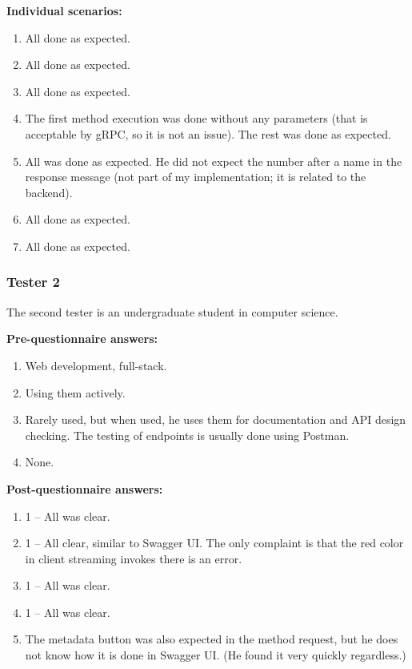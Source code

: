 \textbf{Individual scenarios:}
\begin{enumerate}
    \item All done as expected.
    \item All done as expected.
    \item All done as expected.
    \item The first method execution was done without any parameters (that is acceptable by gRPC, so it is not an issue).
    The rest was done as expected.
    \item All was done as expected.
    He did not expect the number after a name in the response message (not part of my implementation; it is related to the backend).
    \item All done as expected.
    \item All done as expected.
\end{enumerate}

\subsubsection{Tester 2}
The second tester is an undergraduate student in computer science.

\textbf{Pre-questionnaire answers:}
\begin{enumerate}
    \item Web development, full-stack.
    \item Using them actively.
    \item Rarely used, but when used, he uses them for documentation and API design checking.
    The testing of endpoints is usually done using Postman.
    \item None.
\end{enumerate}

\textbf{Post-questionnaire answers:}
\begin{enumerate}
    \item 1 -- All was clear.
    \item 1 -- All clear, similar to Swagger UI\@.
    The only complaint is that the red color in client streaming invokes there is an error.
    \item 1 -- All was clear.
    \item 1 -- All was clear.
    \item The metadata button was also expected in the method request, but he does not know how it is done in Swagger UI\@.
    (He found it very quickly regardless.)
\end{enumerate}

